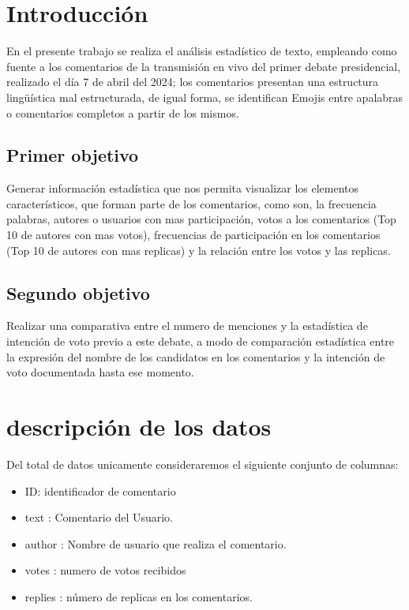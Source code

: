 \chapter{Introducción}

En el presente trabajo se realiza el análisis estadístico de texto, empleando como fuente a los comentarios de la transmisión en vivo del primer debate presidencial, realizado el día 7 de abril del 2024; los comentarios presentan una estructura lingüística mal estructurada, de igual forma, se identifican Emojis entre apalabras o comentarios completos a partir de los mismos.\\


\section{Primer objetivo}
 Generar información estadística que nos permita visualizar los elementos característicos, que forman parte de los comentarios, como son, la frecuencia palabras, autores o usuarios con mas participación, votos a los comentarios (Top 10 de autores con mas votos), frecuencias de participación en los comentarios (Top 10 de autores con mas replicas) y la relación entre los votos y las replicas.\\

\section{Segundo objetivo}
 Realizar una comparativa entre el numero de menciones y la estadística de intención de voto previo a este debate, a modo de comparación estadística entre la expresión del nombre de los candidatos en los comentarios y la intención de voto documentada hasta ese momento.\\
   


\chapter{descripción de los datos}

Del total de datos unicamente consideraremos el siguiente conjunto de columnas:\\

\begin{itemize}
	\item ID: identificador de comentario
	\item text : Comentario del Usuario.
	\item author : Nombre de usuario que realiza el comentario.
	\item votes : numero de votos recibidos 
	\item replies : número de replicas en los comentarios.\\
\end{itemize} 

